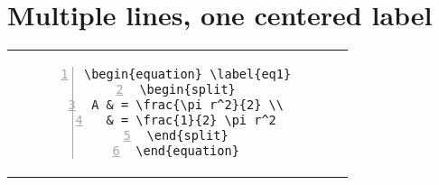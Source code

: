 \section{Multiple lines, one centered label}
\begin{tabular}{l | c}
\begin{minipage}[m]{0.4\textwidth}
\enum{ \begin{equation} \label{eq1}
\begin{split}
A & = \frac{\pi r^2}{2} \\
 & = \frac{1}{2} \pi r^2
\end{split}
\end{equation} }{1.6}
\end{minipage}
& \begin{minipage}[m]{0.5\textwidth}
\renewcommand\textminus{\mbox{-}}%
\begin{lstlisting}[numberstyle=\zebra{black!5}{blue!15},numbers=left,basicstyle=\footnotesize] 
\begin{equation} \label{eq1}
\begin{split}
A & = \frac{\pi r^2}{2} \\
 & = \frac{1}{2} \pi r^2
\end{split}
\end{equation}
\end{lstlisting}
\end{minipage}
\end{tabular}




 
